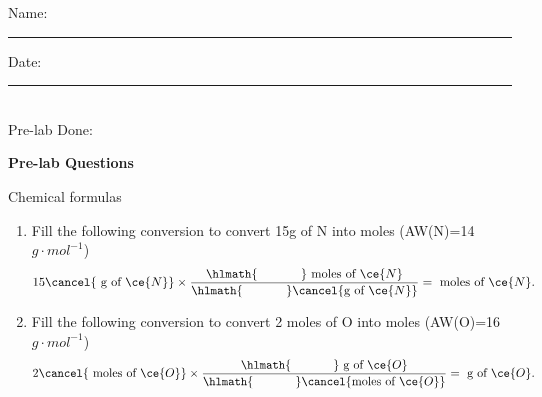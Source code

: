 \documentclass[main.tex]{subfiles}
\begin{document}
\newpage
\setdoublesep{0.35700 em}  %
\setatomsep{1.78500 em}    %
\setbondoffset{0.18265 em} %
\newcommand{\bondwidth}{0.06642 em} %
\setbondstyle{line width = \bondwidth}

\begin{fullwidth}





\begin{multicols}{2}
\begin{tcolorbox}[enhanced jigsaw,breakable,size=title,
colback=mybrown!05,colframe=black,fonttitle=\bfseries,
title=STUDENT INFO,pad at break=1mm, break at=15cm/0pt ]
\vspace{0.2cm}
\noindent Name: \rule{5cm}{0.4pt}Date:\rule{1cm}{0.4pt}\\
Pre-lab Done: \quad
\end{tcolorbox}
\end{multicols}
\hfill
\vspace{0.2cm}
\begin{center}
{\large \bfseries 
Pre-lab Questions 
\par
\Huge
Chemical formulas
\\[5pt] \par}
\vspace{0.2cm}
\end{center}
\par
\noindent
\uline{  \hfill \normalsize \hfill       }

\begin{enumerate}
\item Fill the following conversion to convert  15g of N into moles (AW(N)=14$g\cdot mol^{-1}$)
 \begin{equation*}
15\cancel{\text{ g of }\ce{N}} \times \dfrac{\hlmath{\hspace{35pt}}\text{ moles of }\ce{N}}{\hlmath{\hspace{35pt}}\cancel{\text{g of }\ce{N}}} = \text{ moles of }\ce{N}.
\end{equation*}
\vspace{3cm}


\item Fill the following conversion to convert  2 moles of O into moles (AW(O)=16$g\cdot mol^{-1}$)
 \begin{equation*}
2\cancel{\text{ moles of }\ce{O}} \times \dfrac{\hlmath{\hspace{35pt}}\text{ g of }\ce{O}}{\hlmath{\hspace{35pt}}\cancel{\text{moles of }\ce{O}}} = \text{ g of }\ce{O}.
\end{equation*}
\vspace{1cm}


\end{enumerate}
\end{fullwidth}
\end{document}
